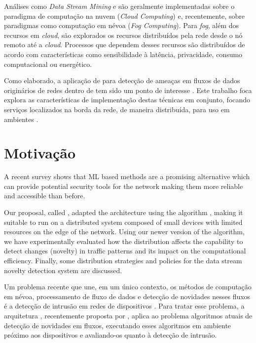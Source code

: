 Análises como \emph{Data Stream Mining} e \nd são geralmente implementadas sobre
o paradigma de computação na nuvem (\emph{Cloud Computing}) e, recentemente,
sobre paradigmas como computação em névoa (\emph{Fog Computing}).
Para \emph{fog}, além dos recursos em \emph{cloud}, são explorados os recursos
distribuídos pela rede desde o nó remoto até a \emph{cloud}.
Processos que dependem desses recursos são distribuídos de acordo com
características como sensibilidade à latência, privacidade, consumo
computacional ou energético.

Como elaborado, a aplicação de \nd para detecção de ameaças em fluxos de dados
originários de redes \iot dentro de \nids tem sido um ponto de interesse
\cite{Viegas2019,AndreoniLopez2019,DaCosta2019a}.
Este trabalho foca explora as características de implementação destas técnicas
em conjunto, focando serviços localizados na borda da rede, de maneira
distribuída, para uso em ambientes \iot.


\section{Motivação}\label{sec:motivo}

A recent survey \cite{Tahsien2020} shows that ML based methods are a
promising alternative which can provide potential security tools for the \iot
network making them more reliable and accessible than before.

Our proposal, called \mfog, adapted the \arch
architecture \cite{Cassales2019a} using the \nd algorithm \minas
\cite{Faria2013Minas,Faria2015minas}, making it suitable to run
on a distributed system composed of small devices with limited
resources on the edge of the network.
Using our newer version of the \minas algorithm, we have experimentally evaluated 
how the distribution 
affects the capability to detect changes (novelty) in
traffic patterns and its impact on the computational efficiency.
Finally, some distribution strategies and policies for the data stream
novelty detection system are discussed.

Um problema recente que une, em um único contexto, os métodos de computação em
névoa, processamento de fluxo de dados e detecção de novidades nesses fluxos é a
detecção de intrusão em redes de dispositivos \iot.
Para tratar esse problema, a arquitetura \arch, recentemente proposta por
, aplica ao problema algoritmos atuais de detecção de
novidades em fluxos, executando esses algoritmos em ambiente próximo aos
dispositivos e avaliando-os quanto à detecção de intrusão.

